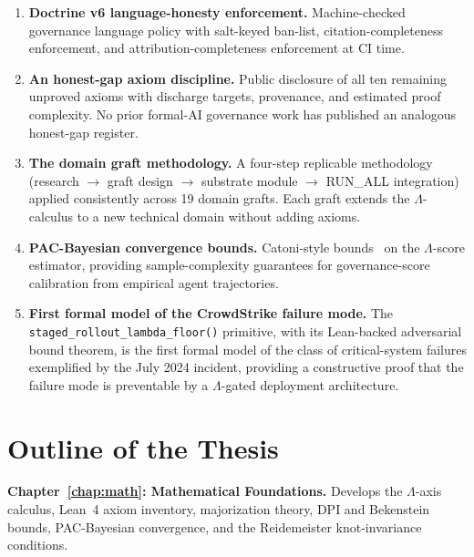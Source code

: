 \begin{enumerate}
  \item \textbf{Doctrine v6 language-honesty enforcement.}
    Machine-checked governance language policy with salt-keyed ban-list,
    citation-completeness enforcement, and attribution-completeness
    enforcement at CI time.

  \item \textbf{An honest-gap axiom discipline.}
    Public disclosure of all ten remaining unproved axioms with discharge
    targets, provenance, and estimated proof complexity.
    No prior formal-AI governance work has published an analogous
    honest-gap register.

  \item \textbf{The domain graft methodology.}
    A four-step replicable methodology (research \(\to\) graft design
    \(\to\) substrate module \(\to\) RUN\_ALL integration) applied
    consistently across 19 domain grafts.
    Each graft extends the \(\Lambda\)-calculus to a new technical domain
    without adding axioms.

  \item \textbf{PAC-Bayesian convergence bounds.}
    Catoni-style bounds~\cite{catoni2007pac} on the \(\Lambda\)-score
    estimator, providing sample-complexity guarantees for governance-score
    calibration from empirical agent trajectories.

  \item \textbf{First formal model of the CrowdStrike failure mode.}
    The \texttt{staged\_rollout\_lambda\_floor()} primitive, with its
    Lean-backed adversarial bound theorem, is the first formal model of
    the class of critical-system failures exemplified by the July 2024
    incident, providing a constructive proof that the failure mode is
    preventable by a \(\Lambda\)-gated deployment architecture.

\end{enumerate}


\section{Outline of the Thesis}
\label{sec:outline}

\textbf{Chapter~\ref{chap:math}: Mathematical Foundations.}
Develops the \(\Lambda\)-axis calculus, Lean~4 axiom inventory, majorization
theory, DPI and Bekenstein bounds, PAC-Bayesian convergence, and the
Reidemeister knot-invariance conditions.

